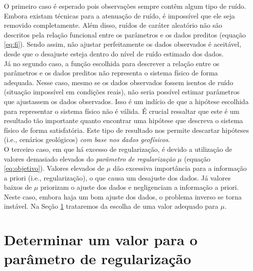 \indent O primeiro caso é esperado pois observações sempre contêm algum tipo de
ruído.
Embora existam técnicas para a atenuação de ruído, é impossível que ele seja
removido completamente.
Além disso, ruídos de caráter aleatório não são descritos pela relação funcional
entre os parâmetros e os dados preditos (equação \ref{eq:fi}).
Sendo assim, não ajustar perfeitamente os dados observados é aceitável, desde que
o desajuste esteja dentro do nível de ruído estimado dos dados.
\\
\indent Já no segundo caso, a função escolhida para descrever a relação entre os
pa\-râ\-me\-tros e os dados preditos não representa o sistema físico de forma adequada.
Nesse caso, mesmo se os dados observados fossem isentos de ruído (situação
impossível em condições reais), não seria possível estimar parâmetros que
ajustassem os dados observados. 
Isso é um indício de que a hipótese escolhida para representar o sistema físico
não é válida.
É crucial ressaltar que este é um resultado tão importante quanto encontrar uma
hipótese que descreva o sistema físico de forma satisfatória.
Este tipo de resultado nos permite descartar hipóteses (i.e., cenários geológicos)
{\it com base nos dados geofísicos}.
\\
\indent O terceiro caso, em que há excesso de regularização, é devido a utilização
de valores demasiado elevados do {\it parâmetro de regularização} $\mu$
(equação \ref{eq:objetivo}).
Valores elevados de $\mu$ dão excessiva importância para a informação a priori
(i.e., regularização), o que causa um desajuste dos dados.
Já valores baixos de $\mu$ priorizam o ajuste dos dados e negligenciam a informação
a priori. Neste caso, embora haja um bom ajuste dos dados, o problema 
inverso se torna instável. Na Seção \ref{sec:valor_mu} trataremos da escolha de uma
valor adequado para $\mu$.

\section{Determinar um valor para o parâmetro de regularização}
\label{sec:valor_mu}

